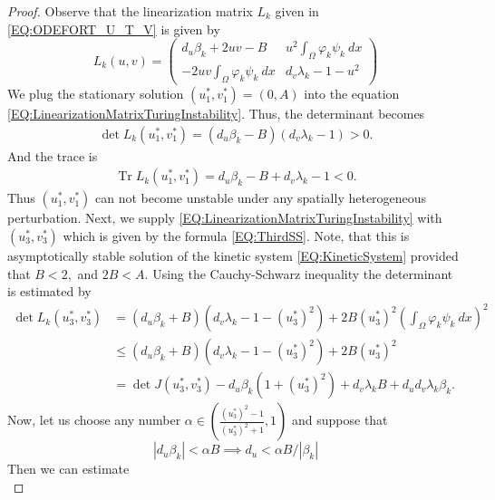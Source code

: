 \documentclass[11pt, a4paper]{article}
\theoremstyle{break}
\theoremstyle{break}
\theoremstyle{break}
\theoremstyle{break}
\theoremstyle{break}
\theoremstyle{break}
\theoremstyle{break}
\theoremstyle{break}
\theoremstyle{break}
\theoremstyle{break}
\DeclareMathOperator{\Tr}{Tr}
\begin{document}
\begin{proof}
    Observe that the linearization matrix $L_k$ given in \eqref{EQ:ODEFORT_U_T_V} is given by
    \begin{equation}
        \label{EQ:LinearizationMatrixTuringInstability}
        L_k(u, v) 
        = 
        \begin{pmatrix}
            d_u \beta_k + 2 u v - B & u^2 \int_\Omega \varphi_k \psi_k \:dx \\ -2u v \int_\Omega \varphi_k \psi_k \:dx & d_v\lambda_k -1-u^2
        \end{pmatrix}
    \end{equation}
    We plug the stationary solution $(u_1^*, v_1^*) = (0, A)$ into the equation \eqref{EQ:LinearizationMatrixTuringInstability}. Thus, the determinant becomes
    \begin{align*}
        \det L_k(u_1^*, v_1^*) = (d_u \beta_k - B) (d_v \lambda_k - 1) > 0.
    \end{align*}
    And the trace is
    \begin{align*}
        \Tr L_k(u_1^*, v_1^*) = d_u \beta_k - B + d_v \lambda_k - 1 < 0.
    \end{align*}
    Thus $(u_1^*, v_1^*)$ can not become unstable under any spatially heterogeneous perturbation. Next, we supply \eqref{EQ:LinearizationMatrixTuringInstability} with $(u_3^*, v_3^*)$ which is given by the formula \eqref{EQ:ThirdSS}. Note, that this is asymptotically stable solution of the kinetic system \eqref{EQ:KineticSystem} provided that $B < 2,$ and $ 2 B < A$. Using the Cauchy-Schwarz inequality the determinant is estimated by
    \begin{align*}
        \det L_k(u_3^*, v_3^*) 
        &= (d_u \beta_k + B) (d_v \lambda_k - 1 - (u_3^*)^2) + 2 B (u_3^*)^2 \left(\int_\Omega \varphi_k \psi_k \:dx\right)^2 \\
        &\leq (d_u \beta_k + B) (d_v \lambda_k - 1 - (u_3^*)^2) + 2 B (u_3^*)^2 \\
        &= \det J(u_3^*, v_3^*) - d_u \beta_k (1 + (u_3^*)^2 ) + d_v \lambda_k B + d_u d_v \lambda_k \beta_k.
    \end{align*}
    Now, let us choose any number $\alpha \in \left(\frac{(u_3^*)^2 - 1}{(u_3^*)^2 + 1}, 1\right)$ and suppose that
    \begin{equation*}
        |d_u \beta_k| < \alpha B \implies d_u < \alpha B / |\beta_k|
    \end{equation*}
    Then we can estimate
    \begin{equation*}

\end{equation*}
\end{proof}
\end{document}

